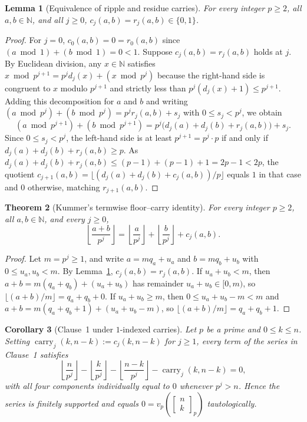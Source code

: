 \documentclass[11pt,a4paper]{article}
\newtheorem{theorem}{Theorem}[section]
\newtheorem{lemma}[theorem]{Lemma}
\newtheorem{corollary}[theorem]{Corollary}
\theoremstyle{definition}
\theoremstyle{remark}
\newcommand{\qbinom}[3]{\begin{bmatrix} #1 \\ #2 \end{bmatrix}_{#3}}
\newcommand{\carry}{\operatorname{carry}}
\begin{document}
\begin{lemma}[Equivalence of ripple and residue carries]
\label{lem:carry-equiv}
For every integer $p \ge 2$, all $a, b \in \mathbb{N}$, and all $j \ge 0$,
$c_j(a,b) = r_j(a,b) \in \{0,1\}$.
\end{lemma}

\begin{proof}
For $j = 0$, $c_0(a,b) = 0 = r_0(a,b)$ since $(a \bmod 1) + (b \bmod 1) = 0 < 1$.
Suppose $c_j(a,b) = r_j(a,b)$ holds at $j$. By Euclidean division, any $x \in \mathbb{N}$
satisfies $x \bmod p^{j+1} = p^j d_j(x) + (x \bmod p^j)$ because the right-hand side
is congruent to $x$ modulo $p^{j+1}$ and strictly less than
$p^j(d_j(x) + 1) \le p^{j+1}$. Adding this decomposition for $a$ and $b$ and writing
$(a \bmod p^j) + (b \bmod p^j) = p^j r_j(a,b) + s_j$ with $0 \le s_j < p^j$, we obtain
\[
  (a \bmod p^{j+1}) + (b \bmod p^{j+1})
  = p^j \bigl(d_j(a) + d_j(b) + r_j(a,b)\bigr) + s_j.
\]
Since $0 \le s_j < p^j$, the left-hand side is at least $p^{j+1} = p^j \cdot p$ if
and only if $d_j(a) + d_j(b) + r_j(a,b) \ge p$. As
$d_j(a) + d_j(b) + r_j(a,b) \le (p-1) + (p-1) + 1 = 2p - 1 < 2p$, the quotient
$c_{j+1}(a,b) = \lfloor(d_j(a) + d_j(b) + c_j(a,b))/p\rfloor$ equals $1$ in that case
and $0$ otherwise, matching $r_{j+1}(a,b)$.
\end{proof}

\begin{theorem}[Kummer's termwise floor--carry identity]
\label{thm:kummer-term}
For every integer $p \ge 2$, all $a, b \in \mathbb{N}$, and every $j \ge 0$,
\[
  \left\lfloor \frac{a+b}{p^j} \right\rfloor
  = \left\lfloor \frac{a}{p^j} \right\rfloor
  + \left\lfloor \frac{b}{p^j} \right\rfloor
  + c_j(a,b).
\]
\end{theorem}

\begin{proof}
Let $m = p^j \ge 1$, and write $a = m q_a + u_a$ and $b = m q_b + u_b$ with
$0 \le u_a, u_b < m$. By Lemma~\ref{lem:carry-equiv}, $c_j(a,b) = r_j(a,b)$.
If $u_a + u_b < m$, then $a + b = m(q_a + q_b) + (u_a + u_b)$ has remainder
$u_a + u_b \in [0, m)$, so $\lfloor (a+b)/m \rfloor = q_a + q_b + 0$.
If $u_a + u_b \ge m$, then $0 \le u_a + u_b - m < m$ and
$a + b = m(q_a + q_b + 1) + (u_a + u_b - m)$, so
$\lfloor (a+b)/m \rfloor = q_a + q_b + 1$.
\end{proof}

\begin{corollary}[Clause~1 under $1$-indexed carries]
\label{cor:clause1-1idx}
Let $p$ be a prime and $0 \le k \le n$. Setting $\carry_j(k,n-k) := c_j(k,n-k)$ for
$j \ge 1$, every term of the series in Clause~1 satisfies
\[
  \left\lfloor \frac{n}{p^j} \right\rfloor
  - \left\lfloor \frac{k}{p^j} \right\rfloor
  - \left\lfloor \frac{n-k}{p^j} \right\rfloor
  - \carry_j(k,n-k) = 0,
\]
with all four components individually equal to $0$ whenever $p^j > n$. Hence the
series is finitely supported and equals $0 = v_p\!\left(\qbinom{n}{k}{p}\right)$
tautologically.
\end{corollary}
\end{document}
